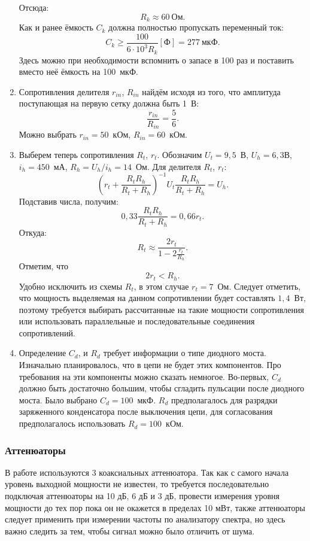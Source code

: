 \documentclass[a4paper,14pt]{extarticle}
\begin{document}
\begin{enumerate}
\[		\]
		Отсюда:
		\[
			R_k \approx 60~\text{Ом}.
		\]
		Как и ранее ёмкость $C_k$ должна полностью пропускать переменный ток:
		\[
			C_k \geq \frac{100}{6\cdot10^3 R_k} [\text{Ф}] = 277~\text{мкФ}.
		\]
		Здесь можно при необходимости вспомнить о запасе в 100 раз и поставить вместо неё ёмкость на 100~мкФ.
		\item
		Сопротивления делителя $r_{in}$, $R_{in}$ найдём исходя из того, что амплитуда поступающая на первую сетку должна быть 1~В:
		\[
			\frac{r_{in}}{R_{in}} = \frac{5}{6}.
		\]
		Можно выбрать $r_{in} = 50$~кОм, $R_{in} = 60$~кОм.
		\item 
		Выберем теперь сопротивления $R_t$, $r_t$. Обозначим $U_{t} = 9{,}5$~В, $U_{h} = 6{,}3$В, $i_h=450$~мА, $R_h = U_h/ i_h = 14$~Ом. Для делителя $R_t$, $r_t$:
		\[
			\left(r_t + \frac{R_t R_h}{R_t + R_h}\right)^{-1} U_t  \frac{R_t R_h}{R_t + R_h} = U_h.
		\]
		Подставив числа, получим:
		\[
			 0{,}33 \frac{R_t R_h}{R_t + R_h} = 0{,}66 r_t.
		\]
		Откуда:
		\[
			R_t \approx \frac{2r_t}{1 - 2 \frac{r_t}{R_h}}.
		\]
		Отметим, что
		\[
			2 r_t < R_h.
		\]
		Удобно исключить из схемы $R_t$, в этом случае $r_t = 7$~Ом. Следует отметить, что мощность выделяемая на данном сопротивлении будет составлять $1{,}4$~Вт, поэтому требуется выбирать рассчитанные на такие мощности сопротивления или использовать параллельные и последовательные соединения сопротивлений.
		\item 
		Определение $C_d$, и $R_d$ требует информации о типе диодного моста. Изначально планировалось, что в цепи не будет этих компонентов. Про требования на эти компоненты можно сказать немногое. Во-первых, $C_d$ должно быть достаточно большим, чтобы сгладить пульсации после диодного моста. Было выбрано $C_d = 100$~мкФ. $R_d$ предполагалось для разрядки заряженного конденсатора после выключения цепи, для согласования предполагалось использовать $R_d = 100$~кОм.
	\end{enumerate}

    \subsubsection{Аттенюаторы}
	
	В работе используются 3 коаксиальных аттенюатора. Так как с самого начала уровень выходной мощности не известен, то требуется последовательно подключая аттенюаторы на 10 дБ, 6 дБ и 3 дБ, провести измерения уровня мощности до тех пор пока он не окажется в пределах 10 мВт, также аттенюаторы следует применить при измерении частоты по анализатору спектра, но здесь важно следить за тем, чтобы сигнал можно было отличить от шума. 
    
\end{document}
